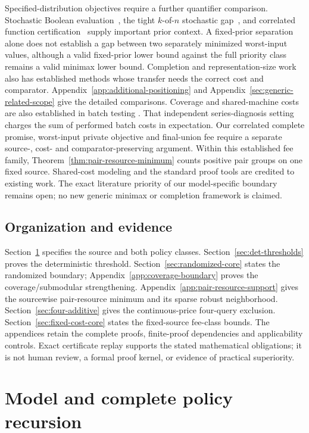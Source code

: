 \documentclass[pdflatex,sn-mathphys-num]{sn-jnl}
\theoremstyle{thmstyleone}
\theoremstyle{thmstylethree}
\theoremstyle{thmstyletwo}
\begin{document}
Specified-distribution objectives require a further quantifier comparison.
Stochastic Boolean evaluation~\cite{hellerstein2022adaptivity}, the tight
$k$-of-$n$ stochastic gap~\cite{nielsen2025kofn}, and correlated function
certification~\cite{ghuge2026correlations} supply important prior context.
A fixed-prior separation alone does not establish a gap between two
separately minimized worst-input values, although a valid fixed-prior
lower bound against the full priority class remains a valid minimax
lower bound. Completion and representation-size work also has established
methods whose transfer needs the correct cost and comparator.
Appendix~\ref{app:additional-positioning} and
Appendix~\ref{sec:generic-related-scope} give the detailed comparisons.
Coverage and shared-machine costs are also established in batch testing
\cite{harris2025}. That independent series-diagnosis setting charges the
sum of performed batch costs in expectation. Our correlated complete
promise, worst-input private objective and final-union fee require a
separate source-, cost- and comparator-preserving argument.
Within this established fee family,
Theorem~\ref{thm:pair-resource-minimum} counts positive pair groups on one
fixed source. Shared-cost modeling and the standard proof tools are
credited to existing work.
The exact literature priority of our model-specific boundary remains open;
no new generic minimax or completion framework is claimed.

\subsection{Organization and evidence}
Section~\ref{sec:model-core} specifies the source and both policy classes.
Section~\ref{sec:det-thresholds} proves the deterministic threshold.
Section~\ref{sec:randomized-core} states the randomized boundary;
Appendix~\ref{app:coverage-boundary} proves the coverage/submodular strengthening.
Appendix~\ref{app:pair-resource-support} gives the sourcewise pair-resource
minimum and its sparse robust neighborhood.
Section~\ref{sec:four-additive} gives the continuous-price four-query
exclusion. Section~\ref{sec:fixed-cost-core} states the fixed-source
fee-class bounds. The appendices retain the complete proofs, finite-proof
dependencies and applicability controls. Exact certificate replay supports
the stated mathematical obligations; it is not human review, a formal
proof kernel, or evidence of practical superiority.

\section{Model and complete policy recursion}\label{sec:model-core}
\end{document}
